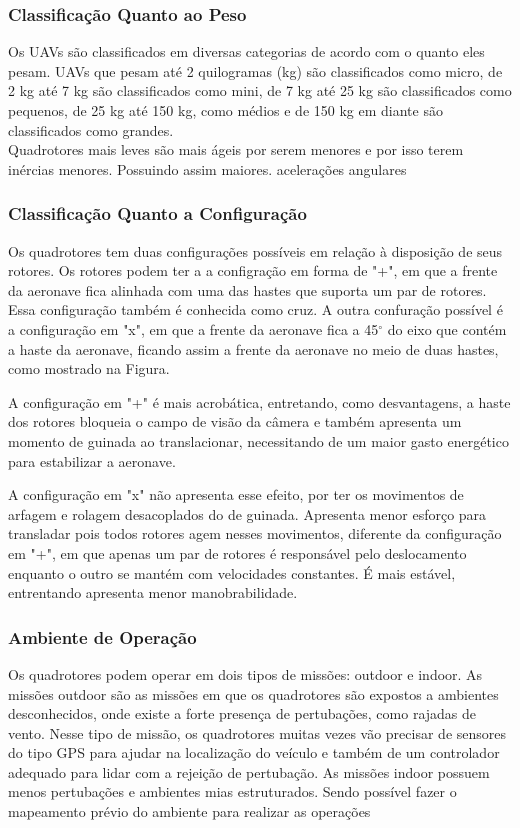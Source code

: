\subsubsection{Classificação Quanto ao Peso}
Os UAVs são classificados em diversas categorias de acordo com o quanto eles pesam. UAVs que pesam até 2 quilogramas (kg) são classificados como micro, de 2 kg até 7 kg são classificados como mini, de 7 kg até 25 kg são classificados como pequenos, de 25 kg até 150 kg, como médios e de 150 kg em diante são classificados como grandes.\\
Quadrotores mais leves são mais ágeis por serem menores e por isso terem inércias menores. Possuindo assim maiores. acelerações angulares 
\subsubsection{Classificação Quanto a Configuração}
Os quadrotores tem duas configurações possíveis em relação à disposição de seus rotores. Os rotores podem ter a a configração em forma de "+", em que a frente da aeronave fica alinhada com uma das hastes que suporta um par de rotores. Essa configuração também é conhecida como cruz. A outra confuração possível é a configuração em "x", em que a frente da aeronave fica a 45$^{\circ}$ do eixo que contém a haste da aeronave, ficando assim a frente da aeronave no meio de duas hastes, como mostrado na Figura.

A configuração em "+" é mais acrobática, entretando, como desvantagens, a haste dos rotores bloqueia o campo de visão da câmera e também apresenta um momento de guinada ao translacionar, necessitando de um maior gasto energético para estabilizar a aeronave.

A configuração em "x" não apresenta esse efeito, por ter os movimentos de arfagem e rolagem desacoplados do de guinada. Apresenta menor esforço para transladar pois todos rotores agem nesses movimentos, diferente da configuração em "+", em que apenas um par de rotores é responsável pelo deslocamento enquanto o outro se mantém com velocidades constantes. É mais estável, entrentando apresenta menor manobrabilidade.
\subsubsection{Ambiente de Operação}
Os quadrotores podem operar em dois tipos de missões: outdoor e indoor. As missões outdoor são as missões em que os quadrotores são expostos a ambientes desconhecidos, onde existe a forte presença de pertubações, como rajadas de vento. Nesse tipo de missão, os quadrotores muitas vezes vão precisar de sensores do tipo GPS para ajudar na localização do veículo e também de um controlador adequado para lidar com a rejeição de pertubação. As missões indoor possuem menos pertubações e ambientes mias estruturados. Sendo possível fazer o mapeamento prévio do ambiente para realizar as operações 

